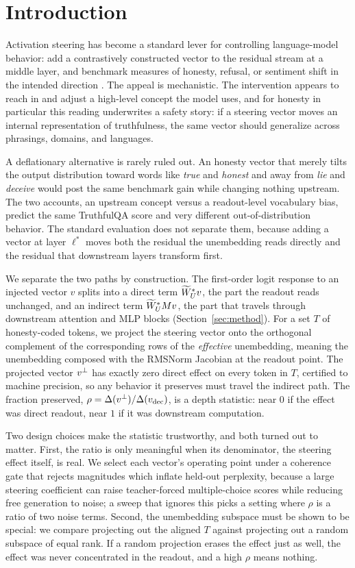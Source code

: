 \section{Introduction}\label{sec:intro}

Activation steering has become a standard lever for controlling language-model behavior: add a contrastively constructed vector to the residual stream at a middle layer, and benchmark measures of honesty, refusal, or sentiment shift in the intended direction \citep{zou2023repe,rimsky2024caa,li2023iti,arditi2024refusal}. The appeal is mechanistic. The intervention appears to reach in and adjust a high-level concept the model uses, and for honesty in particular this reading underwrites a safety story: if a steering vector moves an internal representation of truthfulness, the same vector should generalize across phrasings, domains, and languages.

A deflationary alternative is rarely ruled out. An honesty vector that merely tilts the output distribution toward words like \emph{true} and \emph{honest} and away from \emph{lie} and \emph{deceive} would post the same benchmark gain while changing nothing upstream. The two accounts, an upstream concept versus a readout-level vocabulary bias, predict the same TruthfulQA score and very different out-of-distribution behavior. The standard evaluation does not separate them, because adding a vector at layer $\ell^{*}$ moves both the residual the unembedding reads directly and the residual that downstream layers transform first.

We separate the two paths by construction. The first-order logit response to an injected vector $v$ splits into a direct term $\widetilde{W}_{U}^{*} v$, the part the readout reads unchanged, and an indirect term $\widetilde{W}_{U}^{*} M v$, the part that travels through downstream attention and MLP blocks (Section~\ref{sec:method}). For a set $T$ of honesty-coded tokens, we project the steering vector onto the orthogonal complement of the corresponding rows of the \emph{effective} unembedding, meaning the unembedding composed with the RMSNorm Jacobian at the readout point. The projected vector $v^{\perp}$ has exactly zero direct effect on every token in $T$, certified to machine precision, so any behavior it preserves must travel the indirect path. The fraction preserved, $\rho = \Delta(v^{\perp})/\Delta(v_{\mathrm{dec}})$, is a depth statistic: near $0$ if the effect was direct readout, near $1$ if it was downstream computation.

Two design choices make the statistic trustworthy, and both turned out to matter. First, the ratio is only meaningful when its denominator, the steering effect itself, is real. We select each vector's operating point under a coherence gate that rejects magnitudes which inflate held-out perplexity, because a large steering coefficient can raise teacher-forced multiple-choice scores while reducing free generation to noise; a sweep that ignores this picks a setting where $\rho$ is a ratio of two noise terms. Second, the unembedding subspace must be shown to be special: we compare projecting out the aligned $T$ against projecting out a random subspace of equal rank. If a random projection erases the effect just as well, the effect was never concentrated in the readout, and a high $\rho$ means nothing.

